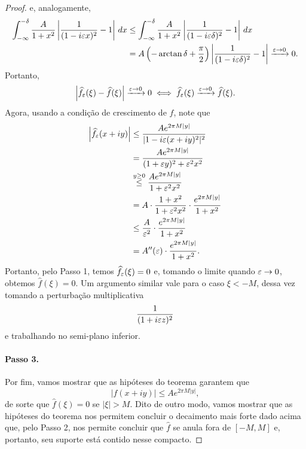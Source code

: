 \begin{proof}
            e, analogamente,
            \begin{align*}
                \int_{-\infty}^{-\delta} \frac{A}{1+ x^2}\left| \frac{1}{(1-i\varepsilon x)^2} - 1 \right| \, dx
                &\leq \int_{-\infty}^{-\delta} \frac{A}{1+ x^2}\left| \frac{1}{(1-i\varepsilon\delta)^2} - 1 \right| \, dx \\
                &=  A\left( -\arctan\delta + \frac{\pi}{2} \right) \left| \frac{1}{(1-i\varepsilon\delta)^2} - 1 \right| 
                \xrightarrow{\varepsilon\to 0} 0.
            \end{align*}
            Portanto,
            \begin{equation*}
                \left| \widehat{f_{\varepsilon}}(\xi) - \widehat{f}(\xi) \right| \xrightarrow{\varepsilon\to 0} 0 
                \iff \widehat{f_{\varepsilon}}(\xi) \xrightarrow{\varepsilon\to 0} \widehat{f}(\xi).
            \end{equation*}
            Agora, usando a condição de crescimento de $f$, note que
            \begin{align*}
                \left| \widehat{f_{\varepsilon}}(x+iy) \right| &\leq \frac{Ae^{2\pi M|y|}}{|1 - i\varepsilon (x+iy)^2|^2} \\
                &= \frac{Ae^{2\pi M|y|}}{(1+ \varepsilon y)^2 + \varepsilon^2x^2} \\
                &\stackrel{y\geq 0}{\leq} \frac{Ae^{2\pi M|y|}}{1 + \varepsilon^2x^2} \\
                &= A\cdot\frac{1+x^2}{1 + \varepsilon^2x^2}\cdot\frac{e^{2\pi M|y|}}{1 + x^2} \\
                &\leq \frac{A}{\varepsilon^2}\cdot\frac{e^{2\pi M|y|}}{1 + x^2} \\
                &= A''(\varepsilon)\cdot \frac{e^{2\pi M|y|}}{1 + x^2}.
            \end{align*}
            Portanto, pelo Passo 1, temos $\widehat{f_{\varepsilon}}(\xi) = 0$ e, tomando o limite quando
            $\varepsilon\to 0$, obtemos $\widehat{f}(\xi) = 0$. Um argumento similar vale para o caso
            $\xi < -M$, dessa vez tomando a perturbação multiplicativa
            \begin{equation*}
                \frac{1}{(1 + i\varepsilon z)^2}
            \end{equation*}
            e trabalhando no semi-plano inferior.
            \paragraph{Passo 3.} Por fim, vamos mostrar que as hipóteses
            do teorema garantem que
            \begin{equation*}
                |f(x+iy)| \leq Ae^{2\pi M|y|},
            \end{equation*}
            de sorte que $\widehat{f}(\xi) = 0$ se $|\xi| > M$. Dito
            de outro modo, vamos mostrar que as hipóteses do teorema
            nos permitem concluir o decaimento mais forte dado acima
            que, pelo Passo 2, nos permite concluir que $\widehat{f}$
            se anula fora de $[-M,M]$ e, portanto, seu suporte está
            contido nesse compacto.
            

\end{proof}
